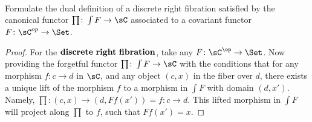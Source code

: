 \documentclass[main.tex]{subfiles}
\begin{document}
\paragraph{}
\begin{exercise}
Formulate the dual definition of a discrete right fibration satisfied by the
canonical functor $\prod \colon \int F \rightarrow \sC$ associated to a covariant
functor $F \colon \sC^{op} \rightarrow \Set$.
\end{exercise}

\begin{proof}
For the $\bold{discrete \ right \ fibration}$, take any $F\colon\sC^{\op}\rightarrow
\Set$. Now providing the forgetful functor $\prod\colon \int F \rightarrow\sC$
with the conditions that for any morphism $f\colon c \rightarrow d$ in $\sC$, and any
object $(c, x)$ in the fiber over $d$, there exists a unique lift of the
morphism $f$ to a morphism in $\int F$ with domain $(d,x')$. Namely, $\prod \colon(c,x) \rightarrow (d, Ff(x')) = f\colon c \rightarrow d$. This lifted morphism in
$\int F$ will project along $\prod$ to $f$, such that $Ff(x') = x$.

\end{proof}
\end{document}
